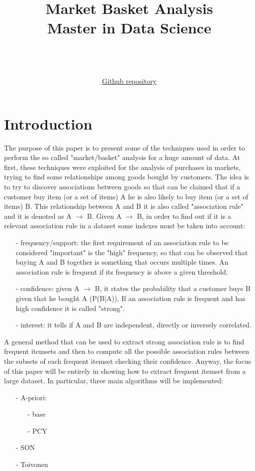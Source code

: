 \documentclass[14pt]{extarticle}
\title{{\Huge Market Basket Analysis}\\{\Large Master in Data Science}}
\author{\bigskip \\ \bigskip{\Large Alberto Bertoncini 983833}\\ \smallskip{\Large Massimo Cavagna 983820}\\ \bigskip \href{https://github.com/Bertonc98/ProgettoAMD}{Github repository} }
\begin{document}
\maketitle
\newpage
\tableofcontents
\newpage
\section{Introduction}
The purpose of this paper is to present some of the techniques used in order to perform the so called "market/basket" analysis for a huge amount of data.
At first, these techniques were exploited for the analysis of purchases in markets, trying to find some relationships among goods bought by customers.
The idea is to try to discover associations between goods so that can be claimed that if a customer buy item (or a set of items) A he is also likely to buy item (or a set of items) B.
This relationship between A and B it is also called "association rule" and it is denoted as A $\rightarrow$ B.
Given A $\rightarrow$ B, in order to find out if it is a relevant association rule in a dataset some indexes must be taken into account:
\begin{itemize}[leftmargin=*]
	\vspace{-0.4cm}\item[-]{frequency/support}: the first requirement of an association rule to be considered "important" is the "high" frequency, so that can be observed that buying A and B together is something that occurs multiple times. An association rule is frequent if its frequency is above a given threshold.
	\vspace{-0.4cm}\item[-]{confidence}: given A $\rightarrow$ B, it states the probability that a customer buys B given that he bought A (P(B|A)). If an association rule is frequent and has high confidence it is called "strong".
	\vspace{-0.4cm}\item[-]{interest}: it tells if A and B are independent, directly or inversely correlated.
\end{itemize}
A general method that can be used to extract strong association rule is to find frequent itemsets and then to compute all the possible association rules between the subsets of each frequent itemset checking their confidence. Anyway, the focus of this paper will be entirely in showing how to extract frequent itemset from a large dataset.
In particular, three main algorithms will be implemented:
\vspace{-0.2cm}\begin{itemize}[leftmargin=*]
\item[-] A-priori:
\vspace{-0.4cm}\begin{itemize}
\item[-] base
\vspace{-0.2cm}\item[-] PCY
\end{itemize}
\vspace{-0.4cm}\item[-] SON
\vspace{-0.4cm}\item[-] Toivonen
\end{itemize}
\end{document}
